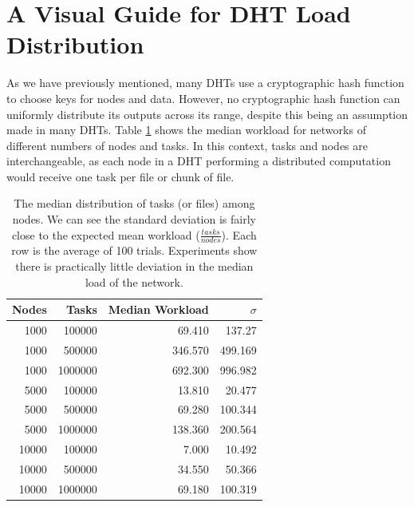 \documentclass[10pt,conference]{IEEEtran}
\begin{document}
%
%

\section{A Visual Guide for DHT Load Distribution }

As we have previously mentioned, many DHTs use a cryptographic hash function to choose keys for nodes and data.
However, no cryptographic hash function can uniformly distribute its outputs across its range, despite this being an assumption made in many DHTs. 
Table \ref{tab:medianLoads} shows the median workload for networks of different numbers of nodes and tasks.
In this context, tasks and nodes are interchangeable, as each node in a DHT performing a distributed computation would receive one task per file or chunk of file.


\begin{table}
	\centering
	\caption{The median distribution of tasks (or files) among nodes.  We can see the standard deviation is fairly close to the expected mean workload ($\frac{tasks}{nodes}$). Each row is the average of 100 trials.  Experiments show there is practically little deviation in the median load of the network.}
	\begin{tabular}{r r r r}
		Nodes & Tasks & Median Workload & $\sigma$ \\ \hline
		1000 & 100000 & 69.410   &  137.27  \\
		1000 & 500000 & 346.570  &  499.169 \\
		1000 & 1000000 & 692.300  &  996.982 \\
		
		5000 & 100000  & 13.810 & 20.477 \\ 
		5000 & 500000  & 69.280 & 100.344 \\ 
		5000 & 1000000 &138.360 & 200.564 \\ 
		
		10000 & 100000 & 7.000   &  10.492 \\
		10000 & 500000 & 34.550  &   50.366 \\
		10000 & 1000000& 69.180  &  100.319 \\
		
		
	\end{tabular}

	\label{tab:medianLoads}
\end{table}
\end{document}
